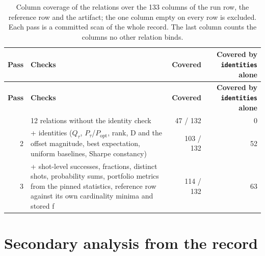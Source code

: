 \documentclass[acmsmall,screen,review]{acmart}
\begin{document}
\begingroup
\small
\setlength\LTleft{\fill}
\setlength\LTright{\fill}
\begin{xltabular}{\textwidth}{rYrr}
\caption{Column coverage of the relations over the 133 columns of the run row, the reference row and the artifact; the one column empty on every row is excluded. Each pass is a committed scan of the whole record. The last column counts the columns no other relation binds.}\label{tab:2} \\
\toprule
\textbf{Pass} & \textbf{Checks} & \textbf{Covered} & \textbf{Covered by \texttt{identities} alone} \\
\midrule
\endfirsthead
\toprule
\textbf{Pass} & \textbf{Checks} & \textbf{Covered} & \textbf{Covered by \texttt{identities} alone} \\
\midrule
\endhead
\endfoot
\bottomrule
{} & 12 relations without the identity check & 47 / 132 & 0 \\*
2 & + identities ($Q_{\tau}$, $P_{\tau}$/$P_{\mathrm{opt}}$, rank, D and the offset magnitude, best expectation, uniform baselines, Sharpe constancy) & 103 / 132 & 52 \\*
3 & + shot-level successes, fractions, distinct shots, probability sums, portfolio metrics from the pinned statistics, reference row against its own cardinality minima and stored f & 114 / 132 & 63 \\
\end{xltabular}
\endgroup


\section{Secondary analysis from the record}
\end{document}
